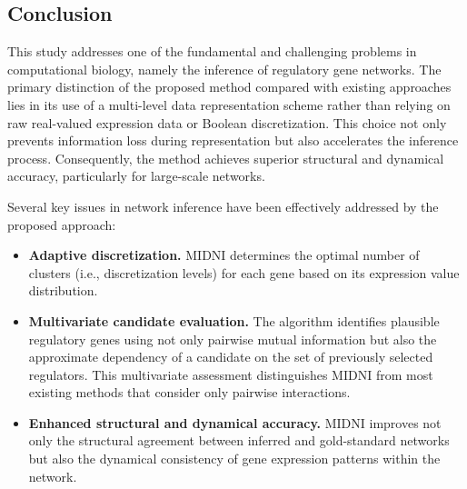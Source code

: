 \subsection{Conclusion}This study addresses one of the fundamental and challenging problems in computational 
biology, namely the inference of regulatory gene networks. The primary distinction of 
the proposed method compared with existing approaches lies in its use of a multi-level 
data representation scheme rather than relying on raw real-valued expression data or 
Boolean discretization. This choice not only prevents information loss during 
representation but also accelerates the inference process. Consequently, the method 
achieves superior structural and dynamical accuracy, particularly for large-scale 
networks.

Several key issues in network inference have been effectively addressed by the proposed 
approach:
\begin{itemize}
    \item \textbf{Adaptive discretization.} MIDNI determines the optimal number of clusters 
    (i.e., discretization levels) for each gene based on its expression value distribution.
    \item \textbf{Multivariate candidate evaluation.} The algorithm identifies plausible 
    regulatory genes using not only pairwise mutual information but also the approximate 
    dependency of a candidate on the set of previously selected regulators. This 
    multivariate assessment distinguishes MIDNI from most existing methods that consider 
    only pairwise interactions.
    \item \textbf{Enhanced structural and dynamical accuracy.} MIDNI improves not only the 
    structural agreement between inferred and gold-standard networks but also the 
    dynamical consistency of gene expression patterns within the network.
\end{itemize}

